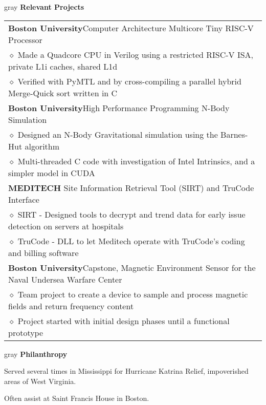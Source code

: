 \documentclass[10.5pt,letterpaper]{article}
\newcommand{\org}[1]{\textbf{#1}}
\newcommand{\pseudoitem}{\diamond}
\newcommand{\vertspace}{\vspace{1.2mm}}
\newcommand{\minorindent}{\hspace{4.5mm}}
\newcommand{\minoritem}{\minorindent $\pseudoitem$ }
\newcommand{\tablewidth}{.9\linewidth}
\newcommand{\undergrad}{Boston University}
\newcommand{\grad}{Boston University}
\begin{document}
	\vertspace
	\noindent
	\begin{heading}{gray}
		\textbf{Relevant Projects}
	\end{heading}
	\begin{tabular*}{\tablewidth}{@{\extracolsep{\fill}}l}
		\org{\grad}\space Computer Architecture Multicore Tiny RISC-V Processor\\
		\minoritem Made a Quadcore CPU in Verilog using a restricted RISC-V ISA, private L1i caches, shared L1d\\
		\minoritem Verified with PyMTL and by cross-compiling a parallel hybrid Merge-Quick sort written in C\\
		\org{\grad}\space High Performance Programming N-Body Simulation\\
		\minoritem Designed an N-Body Gravitational simulation using the Barnes-Hut algorithm\\
		\minoritem Multi-threaded C code with investigation of Intel Intrinsics, and a simpler model in CUDA\\
		\org{MEDITECH} Site Information Retrieval Tool (SIRT) and TruCode Interface\\
		\minoritem SIRT - Designed tools to decrypt and trend data for early issue detection on servers at hospitals\\
		\minoritem TruCode - DLL to let Meditech operate with TruCode's coding and billing software\\
		\org{\undergrad}\space Capstone, Magnetic Environment Sensor for the Naval Undersea Warfare Center\\
		\minoritem Team project to create a device to sample and process magnetic fields and return frequency content\\
		\minoritem Project started with initial design phases until a functional prototype\\
	\end{tabular*}
	

	
	\vertspace
	\noindent
	\begin{heading}{gray}
		\textbf{Philanthropy}
	\end{heading}
	Served several times in Mississippi for Hurricane Katrina Relief, impoverished areas of West Virginia.
	
	Often assist at Saint Francis House in Boston.
\end{document}
